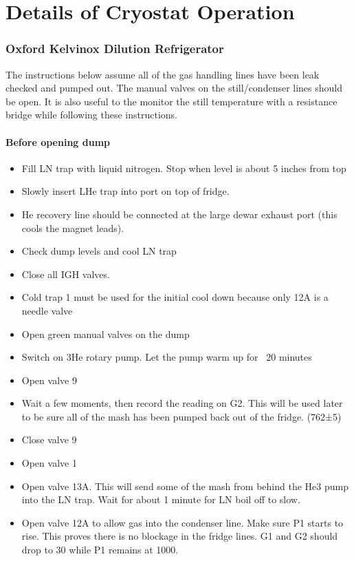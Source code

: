 \chapter{Details of Cryostat Operation}
\label{sec:cryostat}

\subsection{Oxford Kelvinox Dilution Refrigerator}
\label{sec:kelvinox}

The instructions below assume all of the gas handling lines have been leak checked and pumped out. The manual valves on the still/condenser lines should be open. It is also useful to the monitor the still temperature with a resistance bridge while following these instructions.

\subsubsection*{Before opening dump}

\begin{itemize}
\item Fill LN trap with liquid nitrogen. Stop when level is about 5 inches from top
\item Slowly insert LHe trap into port on top of fridge. 
\item He recovery line should be connected at the large dewar exhaust port (this cools the magnet leads).
\item Check dump levels and cool LN trap
\item Close all IGH valves. 
\item Cold trap 1 must be used for the initial cool down because only 12A is a needle valve
\item Open green manual valves on the dump
\item Switch on 3He rotary pump. Let the pump warm up for ~20 minutes
\item Open valve 9
\item Wait a few moments, then record the reading on G2. This will be used later to be sure all of the mash has been pumped back out of the fridge. (762±5)
\item Close valve 9
\item Open valve 1
\item Open valve 13A. This will send some of the mash from behind the He3 pump into the LN trap. Wait for about 1 minute for LN boil off to slow. 
\item Open valve 12A to allow gas into the condenser line. Make sure P1 starts to rise. This proves there is no blockage in the fridge lines. G1 and G2 should drop to 30 while P1 remains at 1000.
\end{itemize}

